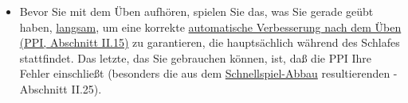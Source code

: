 \begin{itemize}
\item Bevor Sie mit dem Üben aufhören, spielen Sie das, was Sie gerade geübt haben, \hyperref[c1ii17]{langsam}, um eine korrekte \hyperref[c1ii15]{automatische Verbesserung nach dem Üben (PPI, Abschnitt II.15)} zu garantieren, die hauptsächlich während des Schlafes stattfindet.
Das letzte, das Sie gebrauchen können, ist, daß die PPI Ihre Fehler einschließt (besonders die aus dem \hyperref[fpd]{Schnellspiel-Abbau} resultierenden - Abschnitt II.25).
 \end{itemize}




